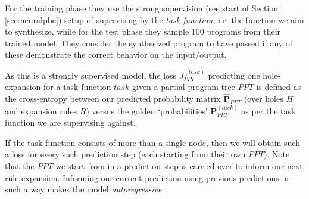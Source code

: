 \documentclass{article} %
\begin{document}
For the training phase they use the strong supervision (see start of Section \ref{sec:neuralpbe})
setup of supervising by the \emph{task function},
i.e. the function we aim to synthesize,
while for the test phase they sample 100 programs from their trained model.
They consider the synthesized program to have passed if any of these demonstrate the correct behavior on the input/output.

As this is a strongly supervised model,
the loss $J^{(task)}_{PPT}$ predicting one hole-expansion for a task function $task$ given a
partial-program tree $PPT$ is defined as the cross-entropy between our predicted probability matrix
$\mathbf{\hat{P}}_{PPT}$ (over holes $H$ and expansion rules $R$)
versus the golden `probabilities' $\mathbf{P}^{(task)}_{PPT}$ as per the task function we are supervising against.


If the task function consists of more than a single node, then we will obtain such a loss for every such prediction step (each starting from their own $PPT$).
Note that the $PPT$ we start from in a prediction step is carried over to inform our next rule expansion.
Informing our current prediction using previous predictions in such a way makes the model \emph{autoregressive}~\citep{kendall1944autoregressive}.
\end{document}
